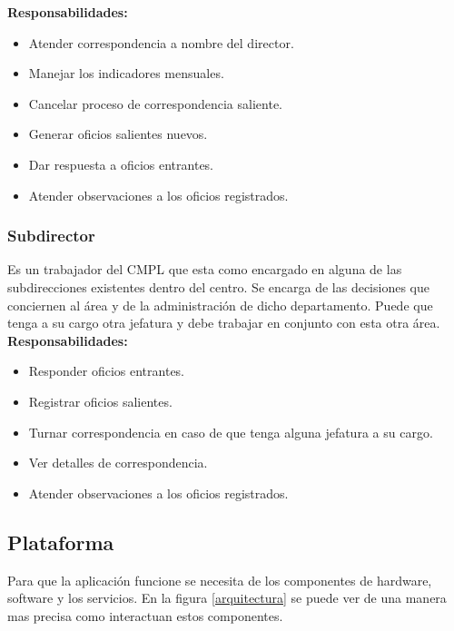 \textbf{Responsabilidades:}
\begin{itemize}
	\item Atender correspondencia a nombre del director.
	\item Manejar los indicadores mensuales.
	\item Cancelar proceso de correspondencia saliente.
	\item Generar oficios salientes nuevos.
	\item Dar respuesta a oficios entrantes.
	\item Atender observaciones a los oficios registrados.
\end{itemize}

\subsubsection{Subdirector}
Es un trabajador del CMPL que esta como encargado en alguna de las subdirecciones existentes dentro del centro. Se encarga de las decisiones que conciernen al área y de la administración de dicho departamento. Puede que tenga a su cargo otra jefatura y debe trabajar en conjunto con esta otra área.\\ 

\textbf{Responsabilidades:}
\begin{itemize}
	\item Responder oficios entrantes.
	\item Registrar oficios salientes.
	\item Turnar correspondencia en caso de que tenga alguna jefatura a su cargo.
	\item Ver detalles de correspondencia.
	\item Atender observaciones a los oficios registrados.
\end{itemize}

\subsection{Plataforma}

Para que la aplicación funcione se necesita de los componentes de hardware, software y los servicios. En la figura \ref{arquitectura} se puede ver de una manera mas precisa como interactuan estos componentes. \\

